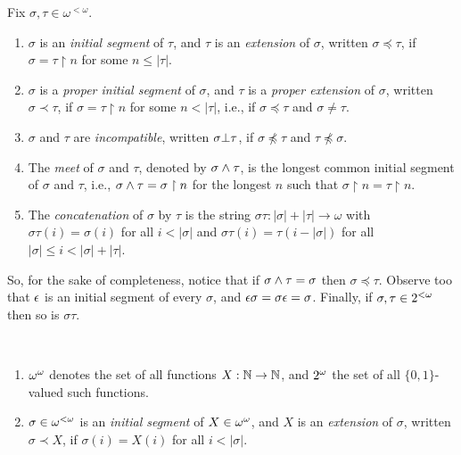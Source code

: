 \begin{definition}
	Fix $\sigma,\tau \in \omega^{<\omega}$.
	\begin{enumerate}
		\item $\sigma$ is an \emph{initial segment} of $\tau$, and $\tau$ is an \emph{extension} of $\sigma$, written $\sigma \preceq \tau$\index{$\preceq$}, if $\sigma = \tau \upharpoonright n$ for some $n \leq |\tau|$.
		\item $\sigma$ is a \emph{proper initial segment} of $\sigma$, and $\tau$ is a \emph{proper extension} of $\sigma$, written $\sigma \prec \tau$\index{$\prec$}, if $\sigma = \tau \upharpoonright n$ for some $n < |\tau|$, i.e., if $\sigma \preceq \tau$ and $\sigma \neq \tau$.
		\item $\sigma$ and $\tau$ are \emph{incompatible}, written $\sigma\bot\tau$, if $\sigma \npreceq \tau$ and $\tau \npreceq \sigma$.
		\item The \emph{meet} of $\sigma$ and $\tau$, denoted by $\sigma \wedge \tau$, is the longest common initial segment of $\sigma$ and $\tau$, i.e., $\sigma \wedge \tau = \sigma \upharpoonright n$ for the longest $n$ such that $\sigma \upharpoonright n = \tau \upharpoonright n$.
		\item The \emph{concatenation} of $\sigma$ by $\tau$ is the string $\sigma\tau: |\sigma| + |\tau| \to \omega$ with $\sigma\tau(i) = \sigma(i)$ for all $i < |\sigma|$ and $\sigma\tau(i) = \tau(i - |\sigma|)$ for all $|\sigma| \leq i < |\sigma| + |\tau|$.
	\end{enumerate}
\end{definition}

So, for the sake of completeness, notice that if $\sigma \wedge \tau = \sigma$ then $\sigma \preceq \tau$. Observe too that $\epsilon$ is an initial segment of every $\sigma$, and $\epsilon\sigma = \sigma\epsilon = \sigma$. Finally, if $\sigma,\tau \in {2^{<\omega}}$ then so is $\sigma\tau$.

\begin{definition}
	\
	\begin{enumerate}
		\item $\Baire$\index{$\Baire$} denotes the set of all functions $X: \mathbb{N} \to \mathbb{N}$, and $\Cantor$\index{$\Cantor$} the set of all $\{0,1\}$-valued such functions.
		\item $\sigma \in {\omega^{<\omega}}$ is an \emph{initial segment}\index{initial segment!sequence} of $X \in {\omega^{\omega}}$, and $X$ is an \emph{extension} of $\sigma$, written $\sigma \prec X$, if $\sigma(i) = X(i)$ for all $i < |\sigma|$.
	\end{enumerate}
\end{definition}

